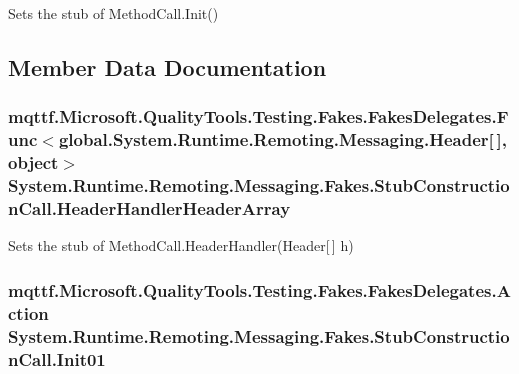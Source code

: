 Sets the stub of Method\-Call.\-Init()



\subsection{Member Data Documentation}
\hypertarget{class_system_1_1_runtime_1_1_remoting_1_1_messaging_1_1_fakes_1_1_stub_construction_call_ab88f5f81905368a41642450b5928963c}{
\subsubsection[{Header\-Handler\-Header\-Array}]{\setlength{\rightskip}{0pt plus 5cm}mqttf.\-Microsoft.\-Quality\-Tools.\-Testing.\-Fakes.\-Fakes\-Delegates.\-Func$<$global.\-System.\-Runtime.\-Remoting.\-Messaging.\-Header\mbox{[}$\,$\mbox{]}, object$>$ System.\-Runtime.\-Remoting.\-Messaging.\-Fakes.\-Stub\-Construction\-Call.\-Header\-Handler\-Header\-Array}}\label{class_system_1_1_runtime_1_1_remoting_1_1_messaging_1_1_fakes_1_1_stub_construction_call_ab88f5f81905368a41642450b5928963c}


Sets the stub of Method\-Call.\-Header\-Handler(\-Header\mbox{[}$\,$\mbox{]} h)

\hypertarget{class_system_1_1_runtime_1_1_remoting_1_1_messaging_1_1_fakes_1_1_stub_construction_call_a4e1189053dcfa83daf2416510129f2b3}{
\subsubsection[{Init01}]{\setlength{\rightskip}{0pt plus 5cm}mqttf.\-Microsoft.\-Quality\-Tools.\-Testing.\-Fakes.\-Fakes\-Delegates.\-Action System.\-Runtime.\-Remoting.\-Messaging.\-Fakes.\-Stub\-Construction\-Call.\-Init01}}\label{class_system_1_1_runtime_1_1_remoting_1_1_messaging_1_1_fakes_1_1_stub_construction_call_a4e1189053dcfa83daf2416510129f2b3}



